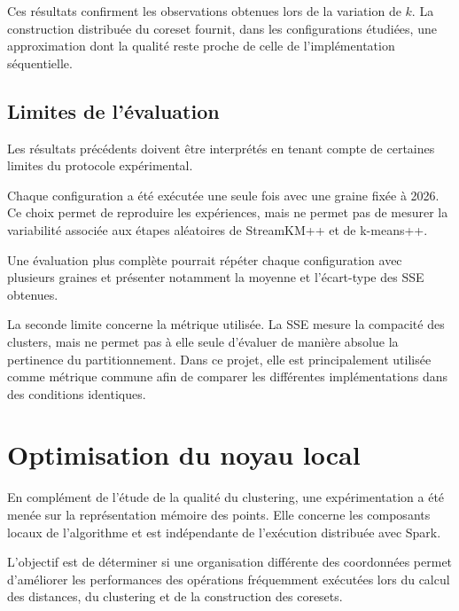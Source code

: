 Ces résultats confirment les observations obtenues lors de la variation de \(k\). La construction distribuée du coreset fournit, dans les configurations étudiées, une approximation dont la qualité reste proche de celle de l'implémentation séquentielle.

\subsection{Limites de l'évaluation}
\label{sec:eval-quality-limits}

Les résultats précédents doivent être interprétés en tenant compte de certaines limites du protocole expérimental.

Chaque configuration a été exécutée une seule fois avec une graine fixée à 2026. Ce choix permet de reproduire les expériences, mais ne permet pas de mesurer la variabilité associée aux étapes aléatoires de StreamKM++ et de k-means++.

Une évaluation plus complète pourrait répéter chaque configuration avec plusieurs graines et présenter notamment la moyenne et l'écart-type des SSE obtenues.

La seconde limite concerne la métrique utilisée. La SSE mesure la compacité des clusters, mais ne permet pas à elle seule d'évaluer de manière absolue la pertinence du partitionnement. Dans ce projet, elle est principalement utilisée comme métrique commune afin de comparer les différentes implémentations dans des conditions identiques.

\section{Optimisation du noyau local}
\label{sec:eval-jmh}

En complément de l'étude de la qualité du clustering, une expérimentation a été menée sur la représentation mémoire des points. Elle concerne les composants locaux de l'algorithme et est indépendante de l'exécution distribuée avec Spark.

L'objectif est de déterminer si une organisation différente des coordonnées permet d'améliorer les performances des opérations fréquemment exécutées lors du calcul des distances, du clustering et de la construction des coresets.

